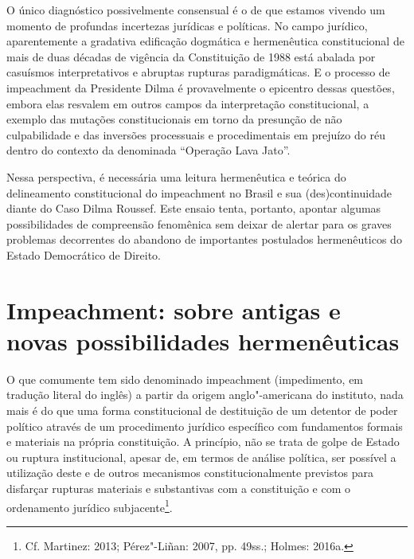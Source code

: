 O único diagnóstico possivelmente consensual é o de que estamos vivendo
um momento de profundas incertezas jurídicas e políticas. No campo
jurídico, aparentemente a gradativa edificação dogmática e hermenêutica
constitucional de mais de duas décadas de vigência da Constituição de
1988 está abalada por casuísmos interpretativos e abruptas rupturas
paradigmáticas. E o processo de impeachment da Presidente Dilma é
provavelmente o epicentro dessas questões, embora elas resvalem em
outros campos da interpretação constitucional, a exemplo das mutações
constitucionais em torno da presunção de não culpabilidade e das
inversões processuais e procedimentais em prejuízo do réu dentro do
contexto da denominada ``Operação Lava Jato''.

Nessa perspectiva, é necessária uma leitura hermenêutica e teórica do
delineamento constitucional do impeachment no Brasil e sua
(des)continuidade diante do Caso Dilma Roussef. Este ensaio tenta,
portanto, apontar algumas possibilidades de compreensão fenomênica sem
deixar de alertar para os graves problemas decorrentes do abandono de
importantes postulados hermenêuticos do Estado Democrático de Direito.

\section{Impeachment: sobre antigas e novas possibilidades
  hermenêuticas}

O que comumente tem sido denominado impeachment (impedimento, em
tradução literal do inglês) a partir da origem anglo"-americana do
instituto, nada mais é do que uma forma constitucional de destituição de
um detentor de poder político através de um procedimento jurídico
específico com fundamentos formais e materiais na própria constituição.
A princípio, não se trata de golpe de Estado ou ruptura institucional,
apesar de, em termos de análise política, ser possível a utilização
deste e de outros mecanismos constitucionalmente previstos para
disfarçar rupturas materiais e substantivas com a constituição e com o
ordenamento jurídico subjacente\footnote{Cf. Martinez: 2013; Pérez"-Liñan: 2007,
pp. 49ss.; Holmes: 2016a.}.

